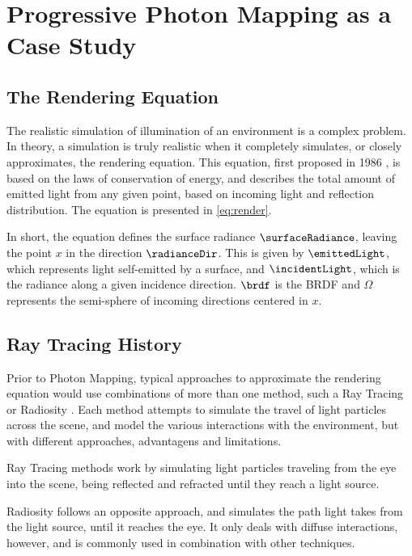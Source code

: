 \documentclass[main.tex]{subfiles}
\begin{document}
\chapter{Progressive Photon Mapping as a Case Study} \label{chapter:photon}



\section{The Rendering Equation}

The realistic simulation of illumination of an environment is a complex problem. In theory, a simulation is truly realistic when it completely simulates, or closely approximates, the rendering equation. This equation, first proposed in 1986 \cite{kajiya1986rendering}, is based on the laws of conservation of energy, and describes the total amount of emitted light from any given point, based on incoming light and reflection distribution. The equation is presented in \cref{eq:render}.


In short, the equation defines the surface radiance $\surfaceRadiance$, leaving the point $x$ in the direction $\radianceDir$. This is given by $\emittedLight$, which represents light self-emitted by a surface, and $\incidentLight$, which is the radiance along a given incidence direction. $\brdf$ is the \acf{BRDF} and $\Omega$ represents the semi-sphere of incoming directions centered in $x$.


\section{Ray Tracing History}

Prior to Photon Mapping, typical approaches to approximate the rendering equation would use combinations of more than one method, such a Ray Tracing or Radiosity . Each method attempts to simulate the travel of light particles across the scene, and model the various interactions with the environment, but with different approaches, advantagens and limitations.

Ray Tracing methods work by simulating light particles traveling from the eye into the scene, being reflected and refracted until they reach a light source.

Radiosity follows an opposite approach, and simulates the path light takes from the light source, until it reaches the eye. It only deals with diffuse interactions, however, and is commonly used in combination with other techniques.
\end{document}
